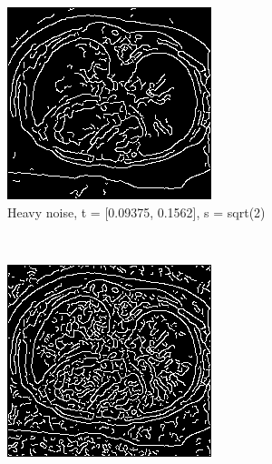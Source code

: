 \begin{figure}[H]
  \centering
  
	\begin{subfigure}{.5\textwidth}
    \centering
    \includegraphics[width=.9\textwidth]{./edgedetection/heavy_noise/h_noise_insens_l_thres}
    \caption{Heavy noise, t = [0.09375, 0.1562], s = sqrt(2)}
    \label{fig:h_noise_insens_l_thres}
  \end{subfigure}\\%
    \begin{subfigure}{.5\textwidth}
    \centering
    \includegraphics[width=.9\textwidth]{./edgedetection/heavy_noise/h_noise_sens_h_thres}

\end{subfigure}
\end{figure}
